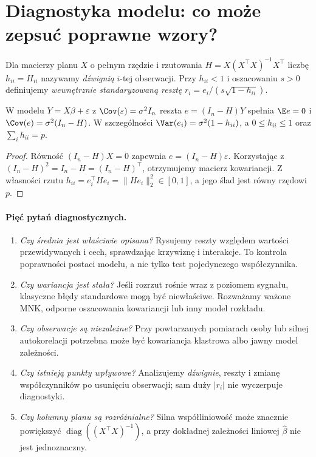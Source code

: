 \section{Diagnostyka modelu: co może zepsuć poprawne wzory?}
\begin{definicja}
Dla macierzy planu $X$ o pełnym rzędzie i rzutowania
$H=X(X^\top X)^{-1}X^\top$ liczbę $h_{ii}=H_{ii}$
nazywamy \emph{dźwignią} $i$-tej obserwacji.
Przy $h_{ii}<1$ i oszacowaniu $s>0$ definiujemy
\emph{wewnętrznie standaryzowaną resztę}
$r_i=e_i/(s\sqrt{1-h_{ii}})$.
\end{definicja}

\begin{stwierdzenie}
W modelu $Y=X\beta+\varepsilon$ z
$\Cov(\varepsilon)=\sigma^2I_n$ reszta $e=(I_n-H)Y$
spełnia $\E e=0$ i
$\Cov(e)=\sigma^2(I_n-H)$.
W szczególności $\Var(e_i)=\sigma^2(1-h_{ii})$,
a $0\le h_{ii}\le1$ oraz $\sum_ih_{ii}=p$.
\end{stwierdzenie}
\begin{proof}
Równość $(I_n-H)X=0$ zapewnia
$e=(I_n-H)\varepsilon$. Korzystając z
$(I_n-H)^2=I_n-H=(I_n-H)^\top$,
otrzymujemy macierz kowariancji. Z własności rzutu
$h_{ii}=e_i^\top He_i=\|He_i\|_2^2\in[0,1]$,
a jego ślad jest równy rzędowi $p$.
\end{proof}

\paragraph{Pięć pytań diagnostycznych.}
\begin{enumerate}
\item \emph{Czy średnia jest właściwie opisana?}
Rysujemy reszty względem wartości przewidywanych i cech,
sprawdzając krzywiznę i interakcje. To kontrola poprawności
postaci modelu, a nie tylko test pojedynczego współczynnika.
\item \emph{Czy wariancja jest stała?} Jeśli rozrzut rośnie
wraz z poziomem sygnału, klasyczne błędy standardowe mogą być
niewłaściwe. Rozważamy ważone MNK, odporne oszacowania
kowariancji lub inny model rozkładu.
\item \emph{Czy obserwacje są niezależne?} Przy powtarzanych
pomiarach osoby lub silnej autokorelacji potrzebna może być
kowariancja klastrowa albo jawny model zależności.
\item \emph{Czy istnieją punkty wpływowe?} Analizujemy
\emph{dźwignie}, reszty i zmianę współczynników po usunięciu
obserwacji; sam duży $|r_i|$ nie wyczerpuje diagnostyki.
\item \emph{Czy kolumny planu są rozróżnialne?}
Silna współliniowość może znacznie powiększyć
$\operatorname{diag}((X^\top X)^{-1})$, a przy dokładnej
zależności liniowej $\widehat\beta$ nie jest jednoznaczny.
\end{enumerate}

